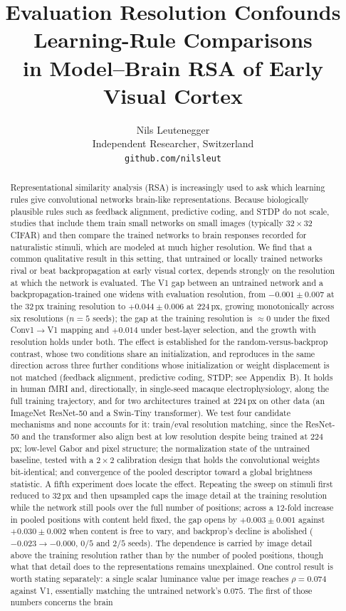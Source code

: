\documentclass[10pt,twocolumn]{article}
\title{Evaluation Resolution Confounds Learning-Rule Comparisons\\
in Model--Brain RSA of Early Visual Cortex}
\author{Nils Leutenegger\\
Independent Researcher, Switzerland\\
\texttt{github.com/nilsleut}}
\date{}
\begin{document}
\maketitle

\begin{abstract}
Representational similarity analysis (RSA) is increasingly used to ask which learning rules give convolutional networks brain-like representations. Because biologically plausible rules such as feedback alignment, predictive coding, and STDP do not scale, studies that include them train small networks on small images (typically $32\times32$ CIFAR) and then compare the trained networks to brain responses recorded for naturalistic stimuli, which are modeled at much higher resolution. We find that a common qualitative result in this setting, that untrained or locally trained networks rival or beat backpropagation at early visual cortex, depends strongly on the resolution at which the network is evaluated. The V1 gap between an untrained network and a backpropagation-trained one widens with evaluation resolution, from $-0.001 \pm 0.007$ at the $32$\,px training resolution to $+0.044 \pm 0.006$ at $224$\,px, growing monotonically across six resolutions ($n=5$ seeds); the gap at the training resolution is $\approx 0$ under the fixed Conv1$\to$V1 mapping and $+0.014$ under best-layer selection, and the growth with resolution holds under both. The effect is established for the random-versus-backprop contrast, whose two conditions share an initialization, and reproduces in the same direction across three further conditions whose initialization or weight displacement is not matched (feedback alignment, predictive coding, STDP; see Appendix~B). It holds in human fMRI and, directionally, in single-seed macaque electrophysiology, along the full training trajectory, and for two architectures trained at $224$\,px on other data (an ImageNet ResNet-50 and a Swin-Tiny transformer). We test four candidate mechanisms and none accounts for it: train/eval resolution matching, since the ResNet-50 and the transformer also align best at low resolution despite being trained at $224$\,px; low-level Gabor and pixel structure; the normalization state of the untrained baseline, tested with a $2\times2$ calibration design that holds the convolutional weights bit-identical; and convergence of the pooled descriptor toward a global brightness statistic. A fifth experiment does locate the effect. Repeating the sweep on stimuli first reduced to $32$\,px and then upsampled caps the image detail at the training resolution while the network still pools over the full number of positions; across a $12$-fold increase in pooled positions with content held fixed, the gap opens by $+0.003 \pm 0.001$ against $+0.030 \pm 0.002$ when content is free to vary, and backprop's decline is abolished ($-0.023 \to -0.000$, $0/5$ and $2/5$ seeds). The dependence is carried by image detail above the training resolution rather than by the number of pooled positions, though what that detail does to the representations remains unexplained. One control result is worth stating separately: a single scalar luminance value per image reaches $\rho = 0.074$ against V1, essentially matching the untrained network's $0.075$. The first of those numbers concerns the brain 
\end{abstract}
\end{document}
